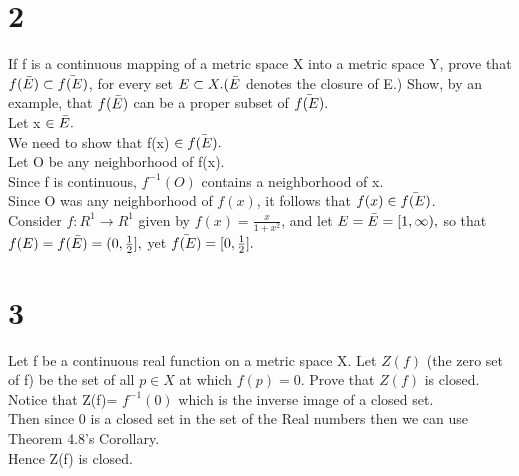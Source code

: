 \section*{2}
If f is a continuous mapping of a metric space X into a metric space Y, prove that $f(\Bar{E}) \subset \Bar{f(E)}$, for every set $E \subset X. (\Bar{E}$ denotes the closure of E.) Show, by an example, that $f(\Bar{E})$ can be a proper subset of $\Bar{f(E)}.$\\ 
Let x $\in \Bar{E}.$ \\ 
We need to show that f(x) $\in \Bar{f(E).}$ \\ 
Let O be any neighborhood of f(x). \\ 
Since f is continuous, $f^{-1}(O)$ contains a neighborhood of x. \\ 
Since O was any neighborhood of $f(x)$, it follows that $f(x) \in \Bar{f(E)}$. \\ 
Consider $f: R ^1 \longrightarrow R^1$ given by $f(x)= \frac{x}{1+x^2}$, and let $E=\Bar{E}=[1, \infty),$ so that $f(E)=f(\Bar{E})= (0, \frac{1}{2}],$ yet $\Bar{f(E)}=[0, \frac{1}{2}].$ \\ 
\section*{3}
Let f be a continuous real function on a metric space X. Let $Z(f)$ (the zero set of f) be the set of all $p \in X$ at which $f(p)=0.$ Prove that $Z(f)$ is closed. \\ 
Notice that Z(f)= $f^{-1}({0})$  which is the inverse image of a closed set. \\Then since ${0}$ is a closed set in the set of the Real numbers then we can use Theorem 4.8's Corollary.\\ Hence Z(f) is closed. 

\\ 
